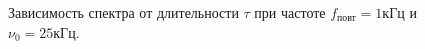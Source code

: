 \documentclass[a4paper, 12pt,twoside]{article}
\begin{document}
\begin{figure}[h]
	\centering
	\begin{minipage}[h]{0.49\linewidth}
	\end{minipage}
	\begin{minipage}[h]{0.49\linewidth}
	\end{minipage}
	
	\caption{Зависимость спектра от длительности $\tau$ при частоте $f_{\text{повт}} = 1\text{кГц}$ и $\nu_{0} = 25\text{кГц}$.}
	\label{ris:image1}
\end{figure}
\end{document}
